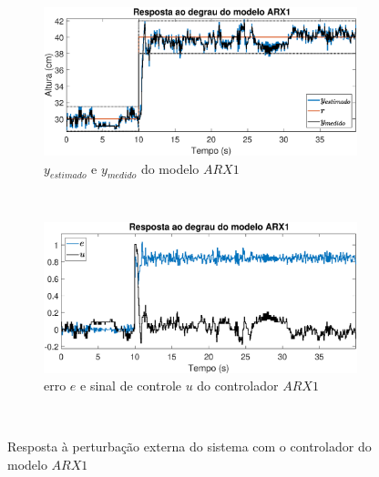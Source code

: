 \begin{figure}[H]
	\centering
	\begin{subfigure}[b]{1\textwidth}
		\includegraphics[width=1\linewidth]{steprarx1y}
		\caption[$y_{estimado}$ e $y_{medido}$ do modelo $ARX1$]{$y_{estimado}$ e $y_{medido}$ do modelo $ARX1$}
		\label{fig:steprarx1y}
	\end{subfigure}
	~ %
	\begin{subfigure}[b]{1\textwidth}
		\includegraphics[width=1\linewidth]{steprarx1e}
		\caption[erro $e$ e sinal de controle $u$ do controlador $ARX1$]{erro $e$ e sinal de controle $u$ do controlador $ARX1$}
		\label{fig:steprarx1e}
	\end{subfigure}
	~ %
	
	\caption{Resposta à perturbação externa do sistema com o controlador do modelo $ARX1$}\label{fig:steprarx1}
\end{figure}

